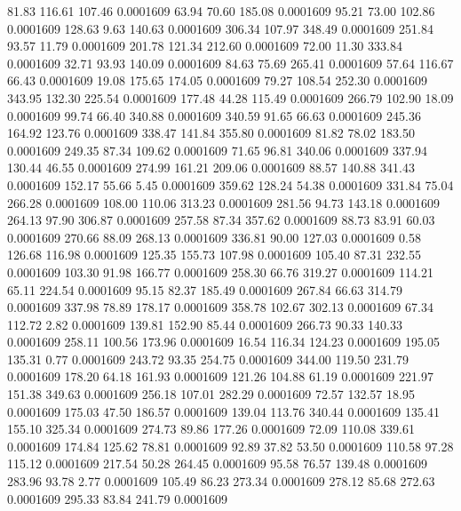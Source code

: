   81.83  116.61  107.46   0.0001609
  63.94   70.60  185.08   0.0001609
  95.21   73.00  102.86   0.0001609
 128.63    9.63  140.63   0.0001609
 306.34  107.97  348.49   0.0001609
 251.84   93.57   11.79   0.0001609
 201.78  121.34  212.60   0.0001609
  72.00   11.30  333.84   0.0001609
  32.71   93.93  140.09   0.0001609
  84.63   75.69  265.41   0.0001609
  57.64  116.67   66.43   0.0001609
  19.08  175.65  174.05   0.0001609
  79.27  108.54  252.30   0.0001609
 343.95  132.30  225.54   0.0001609
 177.48   44.28  115.49   0.0001609
 266.79  102.90   18.09   0.0001609
  99.74   66.40  340.88   0.0001609
 340.59   91.65   66.63   0.0001609
 245.36  164.92  123.76   0.0001609
 338.47  141.84  355.80   0.0001609
  81.82   78.02  183.50   0.0001609
 249.35   87.34  109.62   0.0001609
  71.65   96.81  340.06   0.0001609
 337.94  130.44   46.55   0.0001609
 274.99  161.21  209.06   0.0001609
  88.57  140.88  341.43   0.0001609
 152.17   55.66    5.45   0.0001609
 359.62  128.24   54.38   0.0001609
 331.84   75.04  266.28   0.0001609
 108.00  110.06  313.23   0.0001609
 281.56   94.73  143.18   0.0001609
 264.13   97.90  306.87   0.0001609
 257.58   87.34  357.62   0.0001609
  88.73   83.91   60.03   0.0001609
 270.66   88.09  268.13   0.0001609
 336.81   90.00  127.03   0.0001609
   0.58  126.68  116.98   0.0001609
 125.35  155.73  107.98   0.0001609
 105.40   87.31  232.55   0.0001609
 103.30   91.98  166.77   0.0001609
 258.30   66.76  319.27   0.0001609
 114.21   65.11  224.54   0.0001609
  95.15   82.37  185.49   0.0001609
 267.84   66.63  314.79   0.0001609
 337.98   78.89  178.17   0.0001609
 358.78  102.67  302.13   0.0001609
  67.34  112.72    2.82   0.0001609
 139.81  152.90   85.44   0.0001609
 266.73   90.33  140.33   0.0001609
 258.11  100.56  173.96   0.0001609
  16.54  116.34  124.23   0.0001609
 195.05  135.31    0.77   0.0001609
 243.72   93.35  254.75   0.0001609
 344.00  119.50  231.79   0.0001609
 178.20   64.18  161.93   0.0001609
 121.26  104.88   61.19   0.0001609
 221.97  151.38  349.63   0.0001609
 256.18  107.01  282.29   0.0001609
  72.57  132.57   18.95   0.0001609
 175.03   47.50  186.57   0.0001609
 139.04  113.76  340.44   0.0001609
 135.41  155.10  325.34   0.0001609
 274.73   89.86  177.26   0.0001609
  72.09  110.08  339.61   0.0001609
 174.84  125.62   78.81   0.0001609
  92.89   37.82   53.50   0.0001609
 110.58   97.28  115.12   0.0001609
 217.54   50.28  264.45   0.0001609
  95.58   76.57  139.48   0.0001609
 283.96   93.78    2.77   0.0001609
 105.49   86.23  273.34   0.0001609
 278.12   85.68  272.63   0.0001609
 295.33   83.84  241.79   0.0001609
